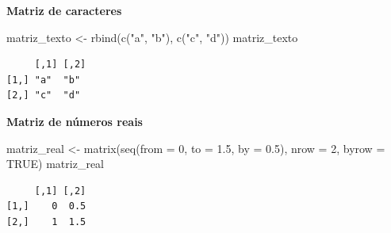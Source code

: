 \documentclass[
  10pt,
  ignorenonframetext,
]{beamer}
\newenvironment{Shaded}{\begin{snugshade}}{\end{snugshade}}
\newcommand{\AttributeTok}[1]{\textcolor[rgb]{0.40,0.45,0.13}{#1}}
\newcommand{\ConstantTok}[1]{\textcolor[rgb]{0.56,0.35,0.01}{#1}}
\newcommand{\DecValTok}[1]{\textcolor[rgb]{0.68,0.00,0.00}{#1}}
\newcommand{\FloatTok}[1]{\textcolor[rgb]{0.68,0.00,0.00}{#1}}
\newcommand{\FunctionTok}[1]{\textcolor[rgb]{0.28,0.35,0.67}{#1}}
\newcommand{\NormalTok}[1]{\textcolor[rgb]{0.00,0.23,0.31}{#1}}
\newcommand{\OtherTok}[1]{\textcolor[rgb]{0.00,0.23,0.31}{#1}}
\newcommand{\StringTok}[1]{\textcolor[rgb]{0.13,0.47,0.30}{#1}}
\begin{document}
\begin{frame}[fragile]
\textbf{Matriz de caracteres}

\begin{Shaded}
\begin{Highlighting}[]
\NormalTok{matriz\_texto }\OtherTok{\textless{}{-}} \FunctionTok{rbind}\NormalTok{(}\FunctionTok{c}\NormalTok{(}\StringTok{"a"}\NormalTok{, }\StringTok{"b"}\NormalTok{), }\FunctionTok{c}\NormalTok{(}\StringTok{"c"}\NormalTok{, }\StringTok{"d"}\NormalTok{))}
\NormalTok{matriz\_texto}
\end{Highlighting}
\end{Shaded}

\begin{verbatim}
     [,1] [,2]
[1,] "a"  "b" 
[2,] "c"  "d" 
\end{verbatim}

\textbf{Matriz de números reais}

\begin{Shaded}
\begin{Highlighting}[]
\NormalTok{matriz\_real }\OtherTok{\textless{}{-}} \FunctionTok{matrix}\NormalTok{(}\FunctionTok{seq}\NormalTok{(}\AttributeTok{from =} \DecValTok{0}\NormalTok{, }\AttributeTok{to =} \FloatTok{1.5}\NormalTok{, }\AttributeTok{by =} \FloatTok{0.5}\NormalTok{),}
                      \AttributeTok{nrow =} \DecValTok{2}\NormalTok{, }\AttributeTok{byrow =} \ConstantTok{TRUE}\NormalTok{)}
\NormalTok{matriz\_real}
\end{Highlighting}
\end{Shaded}

\begin{verbatim}
     [,1] [,2]
[1,]    0  0.5
[2,]    1  1.5
\end{verbatim}
\end{frame}
\end{document}
